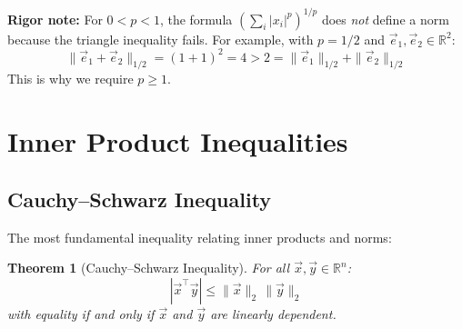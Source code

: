 \documentclass[10pt, twocolumn]{article}
\theoremstyle{definition}
\theoremstyle{plain}
\newtheorem{theorem}{Theorem}
\newcommand{\RR}{\mathbb{R}}
\begin{document}
\begin{tcolorbox}[colframe=black!50]
\textbf{Rigor note:} For $0 < p < 1$, the formula $\left(\sum_{i} |x_i|^p\right)^{1/p}$ does \emph{not} define a norm because the triangle inequality fails. For example, with $p = 1/2$ and $\vec{e}_1, \vec{e}_2 \in \RR^2$:
\[
    \|\vec{e}_1 + \vec{e}_2\|_{1/2} = (1 + 1)^{2} = 4 > 2 = \|\vec{e}_1\|_{1/2} + \|\vec{e}_2\|_{1/2}
\]
This is why we require $p \ge 1$.
\end{tcolorbox}

\section{Inner Product Inequalities}

\subsection{Cauchy--Schwarz Inequality}

The most fundamental inequality relating inner products and norms:

\begin{tcolorbox}
\begin{theorem}[Cauchy--Schwarz Inequality]
For all $\vec{x}, \vec{y} \in \RR^n$:
\[
    |\vec{x}^\top \vec{y}| \le \|\vec{x}\|_2 \, \|\vec{y}\|_2
\]
with equality if and only if $\vec{x}$ and $\vec{y}$ are linearly dependent.
\end{theorem}
\end{tcolorbox}

\begin{center}
\end{center}
\end{document}
